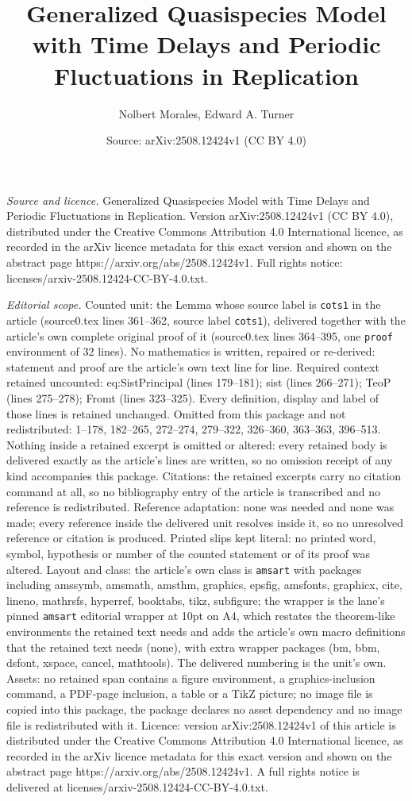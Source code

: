 \documentclass[10pt,a4paper]{amsart}
\title[Generalized Quasispecies Model with Time Delays and Periodic]{Generalized Quasispecies Model with Time Delays and Periodic Fluctuations in Replication}
\author{Nolbert Morales, Edward A. Turner}
\date{Source: arXiv:2508.12424v1 (CC BY 4.0)}
\begin{document}
\maketitle

\noindent\emph{Source and licence.} Generalized Quasispecies Model with Time Delays and Periodic Fluctuations in Replication. Version arXiv:2508.12424v1 (CC BY 4.0), distributed under the Creative Commons Attribution 4.0 International licence, as recorded in the arXiv licence metadata for this exact version and shown on the abstract page https://arxiv.org/abs/2508.12424v1. Full rights notice: licenses/arxiv-2508.12424-CC-BY-4.0.txt.\par\smallskip

\noindent\textit{Editorial scope.} Counted unit: the Lemma whose source label is \texttt{cots1} in the article (source0.tex lines 361--362, source label \texttt{cots1}), delivered together with the article's own complete original proof of it (source0.tex lines 364--395, one \texttt{proof} environment of 32 lines). No mathematics is written, repaired or re-derived: statement and proof are the article's own text line for line. Required context retained uncounted: eq:SistPrincipal (lines 179--181); sist (lines 266--271); TeoP (lines 275--278); Fromt (lines 323--325). Every definition, display and label of those lines is retained unchanged. Omitted from this package and not redistributed: 1--178, 182--265, 272--274, 279--322, 326--360, 363--363, 396--513. Nothing inside a retained excerpt is omitted or altered: every retained body is delivered exactly as the article's lines are written, so no omission receipt of any kind accompanies this package. Citations: the retained excerpts carry no citation command at all, so no bibliography entry of the article is transcribed and no reference is redistributed. Reference adaptation: none was needed and none was made; every reference inside the delivered unit resolves inside it, so no unresolved reference or citation is produced. Printed slips kept literal: no printed word, symbol, hypothesis or number of the counted statement or of its proof was altered. Layout and class: the article's own class is \texttt{amsart} with packages including amssymb, amsmath, amsthm, graphics, epsfig, amsfonts, graphicx, cite, lineno, mathrsfs, hyperref, booktabs, tikz, subfigure; the wrapper is the lane's pinned \texttt{amsart} editorial wrapper at 10pt on A4, which restates the theorem-like environments the retained text needs and adds the article's own macro definitions that the retained text needs (none), with extra wrapper packages (bm, bbm, dsfont, xspace, cancel, mathtools). The delivered numbering is the unit's own. Assets: no retained span contains a figure environment, a graphics-inclusion command, a PDF-page inclusion, a table or a TikZ picture; no image file is copied into this package, the package declares no asset dependency and no image file is redistributed with it. Licence: version arXiv:2508.12424v1 of this article is distributed under the Creative Commons Attribution 4.0 International licence, as recorded in the arXiv licence metadata for this exact version and shown on the abstract page https://arxiv.org/abs/2508.12424v1. A full rights notice is delivered at licenses/arxiv-2508.12424-CC-BY-4.0.txt. 
\end{document}
